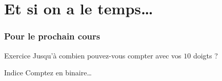 \section{Et si on a le temps\ldots}

%	
	\frame
	{
		\frametitle{Pour le prochain cours}
		
		\begin{block}{Exercice}
			Jusqu'\`a combien pouvez-vous compter avec vos $10$ doigts ?
		\end{block}
		
		{
			\begin{block}{Indice}
				Comptez en binaire\ldots
			\end{block}
		}
	}
